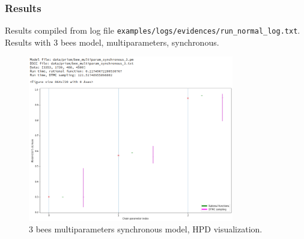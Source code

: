 \documentclass[12pt]{article}
\theoremstyle{definition}
\begin{document}
\subsubsection{Results}
Results compiled from log file \texttt{examples/logs/evidences/run\_normal\_log.txt}.\\
Results with 3 bees model, multiparameters, synchronous.
\begin{figure}[H]
  \centering
  \includegraphics[width=0.8\textwidth,keepaspectratio]{figures/normal_3.png}
  \caption{3 bees multiparameters synchronous model, HPD visualization.}
\end{figure}
\end{document}

